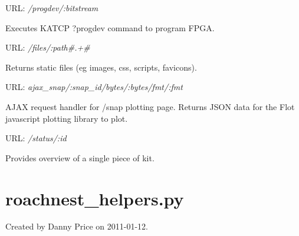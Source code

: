 \documentclass[letterpaper,10pt,english]{sphinxmanual}
\begin{document}

\begin{fulllineitems}
\label{index:roachnest.progdev}
URL: \emph{/progdev/:bitstream}

Executes KATCP ?progdev command to program FPGA.

\end{fulllineitems}



\begin{fulllineitems}
\label{index:roachnest.server_static}
URL: \emph{/files/:path\#.+\#}

Returns static files (eg images, css, scripts, favicons).

\end{fulllineitems}



\begin{fulllineitems}
\label{index:roachnest.snap32}
URL: \emph{ajax\_snap/:snap\_id/bytes/:bytes/fmt/:fmt}

AJAX request handler for /snap plotting page. Returns JSON data for
the Flot javascript plotting library to plot.

\end{fulllineitems}



\begin{fulllineitems}
\label{index:roachnest.view_hardware}
URL: \emph{/status/:id}

Provides overview of a single piece of kit.

\end{fulllineitems}

\label{index:module-roachnest_helpers}

\section{roachnest\_helpers.py}
\label{index:roachnest-helpers-py}
Created by Danny Price on 2011-01-12.
\end{document}
